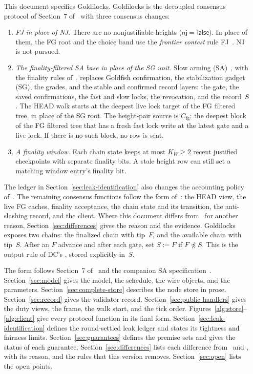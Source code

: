 \documentclass{article}
\theoremstyle{plain}
\theoremstyle{definition}
\theoremstyle{remark}
\newcommand{\nj}{\mathsf{nj}}
\newcommand{\fname}[1]{\text{\textsc{#1}}}
\newcommand{\Cfg}{C_{\mathrm{fg}}}
\newcommand{\DC}[1]{\cite[\S#1]{DC}}
\newcommand{\SAS}{\cite{SAS}}
\newcommand{\FJ}[1]{\cite[\S#1]{FJ}}
\begin{document}
This document specifies Goldilocks.  Goldilocks is the decoupled consensus
protocol of Section~7 of~\cite{DC} with three consensus changes:
\begin{enumerate}[label=(\alph*),nosep]
\item \emph{FJ in place of NJ.}  There are no nonjustifiable heights
  ($\nj=\mathsf{false}$).  In place of them, the FG root and the choice
  band use the \emph{frontier contest} rule FJ~\FJ{2}.  NJ is not pursued.
\item \emph{The finality-filtered SA base in place of the SG unit.}
  Slow arming (SA)~\SAS{}, with the finality rules of~\cite[\S2]{FB},
  replaces Goldfish confirmation, the stabilization
  gadget (SG), the grades, and the stable and confirmed record layers:
  the gate, the saved confirmations, the fast and slow locks, the revocation,
  and the record~$S$.  The HEAD walk starts at the deepest live lock target
  of the FG filtered tree, in place of the SG root.  The height-pair
  source is $\Cfg$: the deepest block of the FG filtered tree that has a
  fresh fast lock write at the latest gate and a live lock.  If there
  is no such block, no row is sent.
\item \emph{A finality window.}  Each chain state keeps at most $K_W\geq2$
  recent justified checkpoints with separate finality bits.  A stale
  height row can still set a matching window entry's finality bit.
\end{enumerate}
The ledger in Section~\ref{sec:leak-identification} also changes the
accounting policy of~\DC{8}.  The remaining consensus functions follow
the form of~\DC{7}: the HEAD view, the live FG
caches, finality acceptance, the chain state and its transition, the
anti-slashing record, and the client.  Where this document differs
from~\DC{7} for another reason, Section~\ref{sec:differences} gives the
reason and the evidence.  Goldilocks exposes two chains: the finalized chain
with tip~$F$, and the available chain with tip~$S$.  After an $F$
advance and after each gate, set $S:=F$ if $F\not\preceq S$.  This is
the output rule of DC's \fname{get\_stable}, stored explicitly in~$S$.

The form follows Section~7 of~\cite{DC} and the companion SA
specification~\SAS.  Section~\ref{sec:model} gives the model, the
schedule, the wire objects, and the parameters.
Section~\ref{sec:complete-store} describes the node store in prose.
Section~\ref{sec:record} gives the validator record.
Section~\ref{sec:public-handlers} gives the duty views, the frame, the
walk start, and the tick order.  Figures~\ref{alg:store}--\ref{alg:client}
give every protocol function in its final form.
Section~\ref{sec:leak-identification} defines the round-settled leak
ledger and states its tightness and fairness limits.
Section~\ref{sec:guarantees} defines the premise sets and gives the
status of each guarantee.
Section~\ref{sec:differences} lists each difference from~\DC{7} and
\DC{8}, with
its reason, and the rules that this version removes.
Section~\ref{sec:open} lists the open points.
\end{document}

